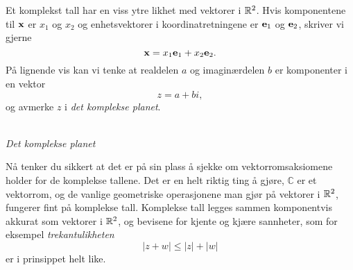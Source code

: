 Et komplekst tall har en viss ytre likhet med vektorer i $\mathbb{R}^2$. 
Hvis komponentene til $\mathbf{x}$ er $x_1$ og $x_2$ og enhetsvektorer i koordinatretningene er $\mathbf{e}_1$ og $\mathbf{e}_2$, 
skriver vi gjerne
\[
\mathbf{x}=x_1 \mathbf{e}_1+x_2 \mathbf{e}_2.
\]
På lignende vis kan vi tenke at realdelen $a$ og imaginærdelen $b$ er komponenter i en vektor
\[
z=a+bi,
\] 
og avmerke $z$ i \emph{det komplekse planet}.
\begin{center}
\\
{\small \textit{Det komplekse planet}}
\end{center}
Nå tenker du sikkert at det er på sin plass å sjekke om vektorromsaksiomene holder for de komplekse tallene. 
Det er en helt riktig ting å gjøre, $\mathbb C$ er et vektorrom, 
og de vanlige geometriske operasjonene man gjør på vektorer i $\mathbb{R}^2$, 
fungerer fint på komplekse tall. 
Komplekse tall legges sammen komponentvis akkurat som vektorer i $\mathbb{R}^2$, 
og bevisene for kjente og kjære sannheter, som for eksempel \emph{trekantulikheten}
\[
|z+w|\leq |z| + |w|
\]
er i prinsippet helt like.


